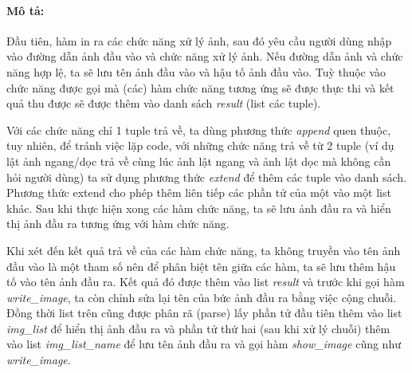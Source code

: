 \documentclass[]{article}
\begin{document}
\paragraph{Mô tả:} Đầu tiên, hàm in ra các chức năng xử lý ảnh, sau đó yêu cầu người dùng nhập vào đường dẫn ảnh đầu vào và chức năng xử lý ảnh. Nếu đường dẫn ảnh và chức năng hợp lệ, ta sẽ lưu tên ảnh đầu vào và hậu tố ảnh đầu vào. Tuỳ thuộc vào chức năng được gọi mà (các) hàm chức năng tương ứng sẽ được thực thi và kết quả thu được sẽ được thêm vào danh sách \textit{result} (list các tuple). \par
Với các chức năng chỉ 1 tuple trả về, ta dùng phương thức \textit{append} quen thuộc, tuy nhiên, để tránh việc lặp code, với những chức năng trả về từ 2 tuple (ví dụ lật ảnh ngang/dọc trả về cùng lúc ảnh lật ngang và ảnh lật dọc mà không cần hỏi người dùng) ta sử dụng phương thức \textit{extend} để thêm các tuple vào danh sách. Phương thức extend cho phép thêm liên tiếp các phần tử của một vào một list khác. Sau khi thực hiện xong các hàm chức năng, ta sẽ lưu ảnh đầu ra và hiển thị ảnh đầu ra tương ứng với hàm chức năng. \par
Khi xét đến kết quả trả về của các hàm chức năng, ta không truyền vào tên ảnh đầu vào là một tham số nên để phân biệt tên giữa các hàm, ta sẽ lưu thêm hậu tố vào tên ảnh đầu ra. Kết quả đó được thêm vào list \textit{result} và trước khi gọi hàm \textit{write\_image}, ta còn chỉnh sửa lại tên của bức ảnh đầu ra bằng việc cộng chuỗi. Đồng thời list trên cũng được phân rã (parse) lấy phần tử đầu tiên thêm vào list \textit{img\_list} để hiển thị ảnh đầu ra và phần tử thứ hai (sau khi xử lý chuỗi) thêm vào list \textit{img\_list\_name} để lưu tên ảnh đầu ra và gọi hàm \textit{show\_image} cũng như \textit{write\_image}.
\end{document}
